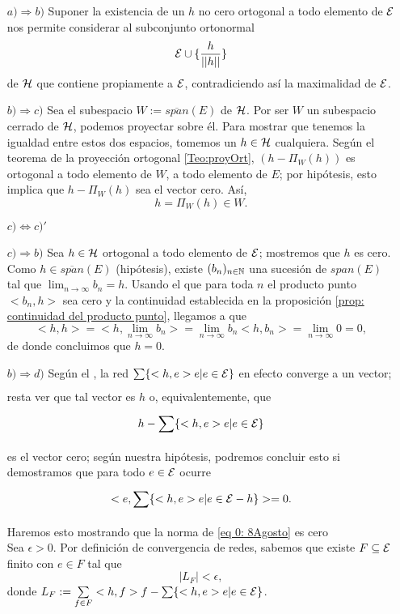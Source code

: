 \begin{itemize}
\item[$a) \Rightarrow b)$] Suponer la existencia de un 
$h$ no cero ortogonal a todo elemento de $\mathcal{E}$
nos permite considerar al subconjunto ortonormal
\[
\mathcal{E} \cup \{ \frac{h}{||h||} \}
\]
de $\mathcal{H}$
que contiene propiamente a $\mathcal{E}$,
contradiciendo así la maximalidad de $\mathcal{E}$.

\item[$b) \Rightarrow c)$] Sea el subespacio
$W := \overline{span}(E)$ de $\mathcal{H}$. Por ser
$W$ un subespacio cerrado de $\mathcal{H}$, podemos proyectar
sobre él. Para mostrar que tenemos la igualdad entre
estos dos espacios, tomemos un $h \in \mathcal{H}$ cualquiera.
Según el teorema de la proyección ortogonal 
\ref{Teo:proyOrt}, $(h-\Pi_{W}(h))$
es ortogonal a todo elemento de $W$, 
a todo elemento de $E$;
por hipótesis, esto implica que $h-\Pi_{W}(h)$ sea el vector cero.
Así,
\[
h = \Pi_{W}(h) \in W.
\]
\item[$c) \iff c)'$]  

\item[$c) \Rightarrow b)$] Sea $h \in \mathcal{H}$
ortogonal a todo elemento de $\mathcal{E}$; mostremos que
$h$ es cero. Como $h \in \overline{span}(E)$ (hipótesis),
existe $(b_{n})_{n \in \mathbb{N}}$ una sucesión de
$span(E)$ tal que
$\lim_{n \rightarrow \infty}b_{n}=h$.
Usando el que para toda $n$ el producto punto $<b_{n}, h>$
sea cero y la continuidad
establecida en la proposición \ref{prop: continuidad del producto punto},
llegamos a que
\[
<h,h>= <h, \lim_{n \rightarrow \infty}b_{n}>= 
\lim_{n \rightarrow \infty}b_{n}<h, b_{n}>= 
\lim_{n \rightarrow \infty} 0 = 0,
\]
de donde concluimos que $h=0$.


\item[$b) \Rightarrow d)$] Según el ,
la red $\sum\limits_{}^{}\{ <h,e>e | e \in \mathcal{E} \}$
en efecto converge a un vector; resta ver que tal 
vector es $h$
o, equivalentemente, que
\begin{equation} \label{eq 0: 8Agosto}
h- \sum\limits_{}^{}\{ <h,e>e | e \in \mathcal{E} \}
\end{equation}
es el vector cero; según nuestra hipótesis, podremos
concluir esto si demostramos que para todo $e \in \mathcal{E}$
ocurre
\[
<e, \sum\limits_{}^{}\{ <h,e>e | e \in \mathcal{E} -h \} > =0.
\]
Haremos esto mostrando que la norma de 
\eqref{eq 0: 8Agosto} es cero \\
Sea $\epsilon >0$.
Por definición de convergencia de redes, sabemos que
existe $F \subseteq \mathcal{E}$ finito con $e \in F$
tal que
\begin{equation} \label{eq 1: 8Agosto}
|L_{F}| < \epsilon,
\end{equation}
donde $L_{F}:= \sum\limits_{f \in F}^{}<h,f>f - 
\sum\limits_{}^{}\{ <h,e>e| e \in \mathcal{E} \}$. \\


\end{itemize}
